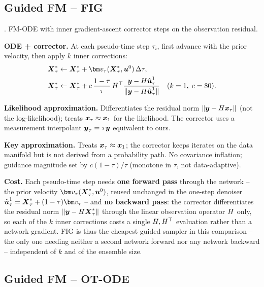 \subsection{Guided FM -- FIG}\label{appendix:method:fig}

\cite{yan_fig_2025}. FM-ODE with inner gradient-ascent corrector steps on the observation residual.

\textbf{ODE + corrector.}
At each pseudo-time step $\tau_i$, first advance with the prior velocity, then apply $k$ inner corrections:
\begin{align}
  \bXstar_\tau &\leftarrow \bXstar_\tau + \fmvel_\tau(\bXstar_\tau,\state^0)\,\Delta\tau, \\
  \bXstar_\tau &\leftarrow \bXstar_\tau
    + c\,\frac{1-\tau}{\tau}\,\obsmatrix^\top
      \frac{\obs - \obsmatrix\hat{\state}^1_\tau}{\|\obs - \obsmatrix\hat{\state}^1_\tau\|}
  \quad (k=1,\; c=80).
\end{align}

\textbf{Likelihood approximation.}
Differentiates the residual norm $\|\boldsymbol{y}-H\boldsymbol{x}_\tau\|$ (not the log-likelihood); treats $\boldsymbol{x}_\tau\approx\boldsymbol{x}_1$ for the likelihood.
The corrector uses a measurement interpolant $\boldsymbol{y}_\tau=\tau\boldsymbol{y}$ equivalent to ours.

\textbf{Key approximation.}
Treats $\boldsymbol{x}_\tau\approx\boldsymbol{x}_1$; the corrector keeps iterates on the data manifold but is not derived from a probability path.
No covariance inflation; guidance magnitude set by $c(1-\tau)/\tau$ (monotone in $\tau$, not data-adaptive).

\textbf{Cost.}
Each pseudo-time step needs \textbf{one forward pass} through the network -- the prior velocity $\fmvel_\tau(\bXstar_\tau,\state^0)$, reused unchanged in the one-step denoiser $\hat{\state}^1_\tau=\bXstar_\tau+(1-\tau)\fmvel_\tau$ -- and \textbf{no backward pass}: the corrector differentiates the residual norm $\|\boldsymbol{y}-H\boldsymbol{X}^{*}_\tau\|$ through the linear observation operator $H$ only, so each of the $k$ inner corrections costs a single $H,H^\top$ evaluation rather than a network gradient. FIG is thus the cheapest guided sampler in this comparison -- the only one needing neither a second network forward nor any network backward -- independent of $k$ and of the ensemble size.

\subsection{Guided FM -- OT-ODE}\label{appendix:method:ot_ode}

